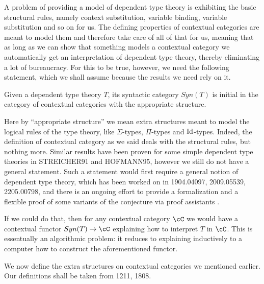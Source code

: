 \documentclass[a4paper,fontsize=12pt]{scrartcl}
\begin{document}
A problem of providing a model of dependent type theory is exhibiting the
basic structural rules, namely context substitution, variable binding,
variable substitution and so on for us. The defining properties of contextual
categories are meant to model them and therefore 
take care of all of that for us, meaning that as long
as we can show that something models a contextual category we automatically get
an interpretation of dependent type theory, thereby eliminating a lot of
bureaucracy. For this to be true, however, we need the following statement,
which we shall assume because the results we need rely on it.

\begin{conj}[Initiality]
  Given a dependent type theory $T$, its syntactic category $Syn(T)$ is initial
  in the category of contextual categories with the appropriate structure.
\end{conj}

Here by ``appropriate structure'' we mean extra structures meant to model the
logical rules of the type theory, like $\Sigma$-types, $\Pi$-types and
$\operatorname{Id}$-types. Indeed, the definition of contextual category as we said deals with
the structural rules, but nothing more.
Similar results have been proven for some simple dependent type theories in
STREICHER91 and HOFMANN95, however we still do not have a general statement.
Such a statement would first require a general notion of dependent type
theory, which has been worked on in 1904.04097, 2009.05539, 2205.00798, and
there is an ongoing effort to provide a formalization and a flexible proof of
some variants of the conjecture via proof assistants .

If we could do that, then for any contextual category $\cC$ we would have a
contextual functor $Syn(T)\rightarrow\cC$ explaining how to interpret $T$ in
$\cC$. This is essentually an algorithmic problem: it reduces to explaining
inductively to a computer how to construct the aforementioned functor.

We now define the extra structures on contextual categories we mentioned
earlier. Our definitions shall be taken from 1211, 1808.
\end{document}
